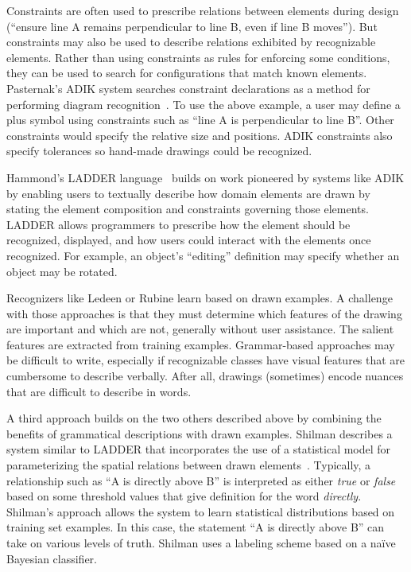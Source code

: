 Constraints are often used to prescribe relations between elements
during design (``ensure line A remains perpendicular to line B, even
if line B moves''). But constraints may also be used to describe
relations exhibited by recognizable elements. Rather than using
constraints as rules for enforcing some conditions, they can be used
to search for configurations that match known elements. Pasternak's
ADIK system searches constraint declarations as a method for
performing diagram recognition~\cite{pasternak-adik}. To use the above
example, a user may define a plus symbol using constraints such as
``line A is perpendicular to line B''. Other constraints would specify
the relative size and positions. ADIK constraints also specify
tolerances so hand-made drawings could be recognized.

Hammond's LADDER language~\cite{hammond-ladder} builds on work
pioneered by systems like ADIK by enabling users to textually describe
how domain elements are drawn by stating the element composition and
constraints governing those elements. LADDER allows programmers to
prescribe how the element should be recognized, displayed, and how
users could interact with the elements once recognized. For example,
an object's ``editing'' definition may specify whether an object may
be rotated.

Recognizers like Ledeen or Rubine learn based on drawn examples. A
challenge with those approaches is that they must determine which
features of the drawing are important and which are not, generally
without user assistance. The salient features are extracted from
training examples. Grammar-based approaches may be difficult to write,
especially if recognizable classes have visual features that are
cumbersome to describe verbally. After all, drawings (sometimes)
encode nuances that are difficult to describe in words.

A third approach builds on the two others described above by combining
the benefits of grammatical descriptions with drawn examples. Shilman
describes a system similar to LADDER that incorporates the use of a
statistical model for parameterizing the spatial relations between
drawn elements~\cite{shilman-parsing}. Typically, a relationship such
as ``A is directly above B'' is interpreted as either \textit{true}
or \textit{false} based on some threshold values that give definition
for the word \textit{directly}. Shilman's approach allows the system
to learn statistical distributions based on training set examples. In
this case, the statement ``A is directly above B'' can take on various
levels of truth. Shilman uses a labeling scheme based on a na\"ive
Bayesian classifier.

